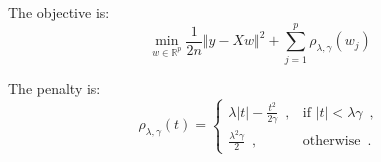 \documentclass[12pt]{article}
\begin{document}
The objective is:
\begin{equation*}
    \min_{w \in \mathbb{R}^p}
        \frac{1}{2 n} \Vert y - X w \Vert^2
        + \sum_{j=1}^p \rho_{\lambda, \gamma}(w_j)
\end{equation*}

The penalty is:
\begin{equation*}
    \rho_{\lambda, \gamma}(t) =
    \begin{cases}
        \lambda |t| - \frac{t^2}{2 \gamma} \enspace, &\text{if } |t| < \lambda \gamma \enspace, \\
        \frac{\lambda^2 \gamma}{2} \enspace, &\mathrm{otherwise} \enspace.
    \end{cases}
\end{equation*}
\end{document}
